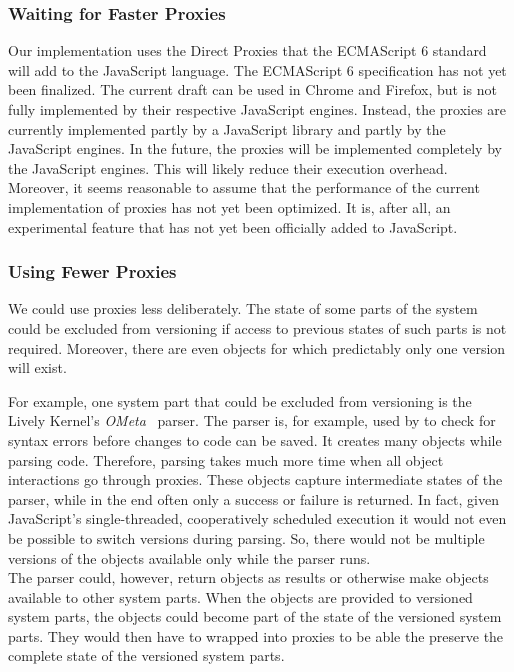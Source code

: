 \subsubsection{Waiting for Faster Proxies}

Our implementation uses the Direct Proxies that the ECMAScript 6 standard will add to the JavaScript language.
The ECMAScript 6 specification has not yet been finalized.
The current draft can be used in Chrome and Firefox, but is not fully implemented by their respective JavaScript engines.
Instead, the proxies are currently implemented partly by a JavaScript library and partly by the JavaScript engines.
In the future, the proxies will be implemented completely by the JavaScript engines.
This will likely reduce their execution overhead.\\
Moreover, it seems reasonable to assume that the performance of the current implementation of proxies has not yet been optimized.
It is, after all, an experimental feature that has not yet been officially added to JavaScript.

\subsubsection{Using Fewer Proxies}

We could use proxies less deliberately.
The state of some parts of the system could be excluded from versioning if access to previous states of such parts is not required.
Moreover, there are even objects for which predictably only one version will exist.

For example, one system part that could be excluded from versioning is the Lively Kernel's \emph{OMeta}~\cite{Warth2007OOL} parser.
The parser is, for example, used by to check for syntax errors before changes to code can be saved.
It creates many objects while parsing code.
Therefore, parsing takes much more time when all object interactions go through proxies.
These objects capture intermediate states of the parser, while in the end often only a success or failure is returned.
In fact, given JavaScript's single-threaded, cooperatively scheduled execution it would not even be possible to switch versions during parsing.
So, there would not be multiple versions of the objects available only while the parser runs.\\
The parser could, however, return objects as results or otherwise make objects available to other system parts.
When the objects are provided to versioned system parts, the objects could become part of the state of the versioned system parts.
They would then have to wrapped into proxies to be able the preserve the complete state of the versioned system parts.


